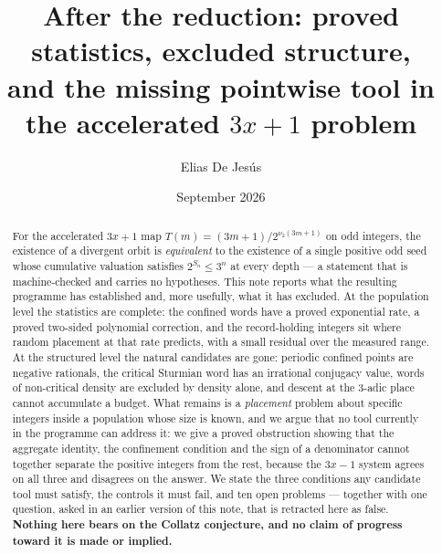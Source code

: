 \documentclass[11pt,reqno]{amsart}
\theoremstyle{plain}
\theoremstyle{definition}
\newcommand{\vt}{\nu_2}
\begin{document}
\title[After the reduction]
{After the reduction: proved statistics, excluded structure,\\
and the missing pointwise tool in the accelerated $3x+1$ problem}

\author{Elias De Jes\'us}
\address{Independent Researcher}
\date{September 2026}


\begin{abstract}
For the accelerated $3x+1$ map $T(m)=(3m+1)/2^{\vt(3m+1)}$ on odd integers, the
existence of a divergent orbit is \emph{equivalent} to the existence of a single
positive odd seed whose cumulative valuation satisfies $2^{S_n}\le 3^n$ at every
depth --- a statement that is machine-checked and carries no hypotheses. This note
reports what the resulting programme has established and, more usefully, what it
has excluded. At the population level the statistics are complete: the confined
words have a proved exponential rate, a proved two-sided polynomial correction,
and the record-holding integers sit where random placement at that rate predicts,
with a small residual over the measured range. At the structured level the natural
candidates are gone: periodic confined points are negative rationals, the critical
Sturmian word has an irrational conjugacy value, words of non-critical density are
excluded by density alone, and descent at the $3$-adic place cannot accumulate a
budget. What remains is a \emph{placement} problem about specific integers inside
a population whose size is known, and we argue that no tool currently in the
programme can address it: we give a proved obstruction showing that the aggregate
identity, the confinement condition and the sign of a denominator cannot together
separate the positive integers from the rest, because the $3x-1$ system agrees on
all three and disagrees on the answer. We state the three conditions any candidate
tool must satisfy, the controls it must fail, and ten open problems --- together
with one question, asked in an earlier version of this note, that is retracted
here as false.
\textbf{Nothing here bears on the Collatz conjecture, and no claim of progress
toward it is made or implied.}
\end{abstract}

\maketitle
\end{document}
